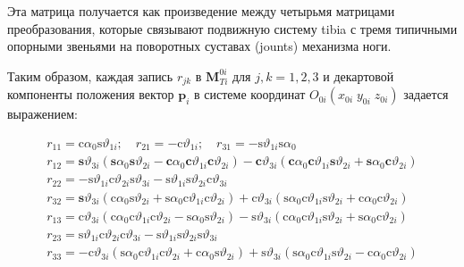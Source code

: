 Эта матрица получается как произведение между четырьмя матрицами преобразования, которые связывают подвижную систему tibia с тремя типичными опорными звеньями на поворотных суставах (jounts) механизма ноги.

Таким образом, каждая запись $r_{jk}$ в $\mathbf{M}^{0i}_{Ti}$ для $j,k = 1,2,3$ и декартовой компоненты положения вектор $\mathbf{p}_i$ в системе координат $O_{0i}(x_{0i}\;y_{0i}\;z_{0i})$ задается выражением:

\begin{equation}
\begin{array}{l}
	r_{11}=\mathrm{c} \alpha_{0} \mathrm{s} \vartheta_{1 i} ; \quad r_{21}=-\mathrm{c} \vartheta_{1 i} ; \quad r_{31}=-\mathrm{s} \vartheta_{1 i} \mathrm{s} \alpha_{0} \\
	r_{12}=\mathbf{s} \vartheta_{3 i}\left(\mathbf{s} \alpha_{0} \mathbf{s} \vartheta_{2 i}-\mathbf{c} \alpha_{0} \mathbf{c} \vartheta_{1 i} \mathbf{c} \vartheta_{2 i}\right)-\mathbf{c} \vartheta_{3 i}\left(\mathbf{c} \alpha_{0} \mathbf{c} \vartheta_{1 i} \mathbf{s} \vartheta_{2 i}+\mathbf{s} \alpha_{0} \mathbf{c} \vartheta_{2 i}\right) \\
	r_{22}=-\mathrm{s} \vartheta_{1 i} \mathrm{c} \vartheta_{2 i} \mathrm{s} \vartheta_{3 i}-\mathrm{s} \vartheta_{1 i} \mathrm{s} \vartheta_{2 i} \mathrm{c} \vartheta_{3 i}\\
	r_{32}=\mathbf{s} \vartheta_{3 i}\left(\mathrm{c} \alpha_{0} \mathrm{s} \vartheta_{2 i}+\mathrm{s} \alpha_{0} \mathrm{c} \vartheta_{1 i} \mathrm{c} \vartheta_{2 i}\right)+\mathrm{c} \vartheta_{3 i}\left(\mathrm{s} \alpha_{0} \mathrm{c} \vartheta_{1 i} \mathrm{s} \vartheta_{2 i}+\mathrm{c} \alpha_{0} \mathrm{c} \vartheta_{2 i}\right)\\
	r_{13}=\mathrm{c} \vartheta_{3 i}\left(\mathrm{c} \alpha_{0} \mathrm{c} \vartheta_{1 i} \mathrm{c} \vartheta_{2 i}-\mathrm{s} \alpha_{0} \mathrm{s} \vartheta_{2 i}\right)-\mathrm{s} \vartheta_{3 i}\left(\mathrm{c} \alpha_{0} \mathrm{c} \vartheta_{1 i} \mathrm{s} \vartheta_{2 i}+\mathrm{s} \alpha_{0} \mathrm{c} \vartheta_{2 i}\right)\\
	r_{23}=\mathrm{s} \vartheta_{1 i} \mathrm{c} \vartheta_{2 i} \mathrm{c} \vartheta_{3 i}-\mathrm{s} \vartheta_{1 i} \mathrm{s} \vartheta_{2 i} \mathrm{s} \vartheta_{3 i}\\
	r_{33}=-\mathrm{c} \vartheta_{3 i}\left(\mathrm{s} \alpha_{0} \mathrm{c} \vartheta_{1 i} \mathrm{c} \vartheta_{2 i}+\mathrm{c} \alpha_{0} \mathrm{s} \vartheta_{2 i}\right)+\mathrm{s} \vartheta_{3 i}\left(\mathrm{s} \alpha_{0} \mathrm{c} \vartheta_{1 i} \mathrm{s} \vartheta_{2 i}-\mathrm{c} \alpha_{0} \mathrm{c} \vartheta_{2 i}\right)\\

\end{array}
\end{equation}
